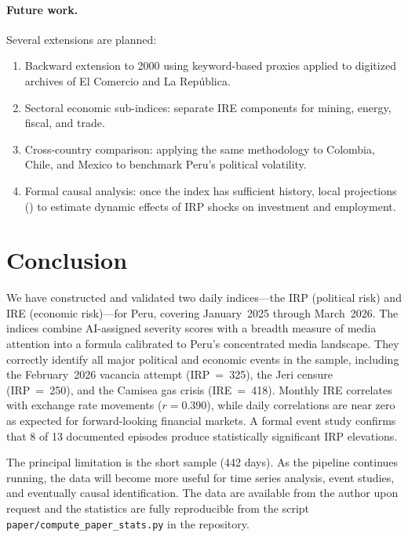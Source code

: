 \documentclass[12pt,a4paper]{article}
\begin{document}
\paragraph{Future work.}
Several extensions are planned:
\begin{enumerate}
  \item Backward extension to 2000 using keyword-based proxies applied to
    digitized archives of El Comercio and La Rep\'ublica.
  \item Sectoral economic sub-indices: separate IRE components for
    mining, energy, fiscal, and trade.
  \item Cross-country comparison: applying the same methodology to
    Colombia, Chile, and Mexico to benchmark Peru's political volatility.
  \item Formal causal analysis: once the index has sufficient history, local
    projections (\citealt{jorda2005}) to estimate dynamic effects of IRP
    shocks on investment and employment.
\end{enumerate}

\section{Conclusion}
\label{sec:conclusion}

We have constructed and validated two daily indices---the IRP (political
risk) and IRE (economic risk)---for Peru, covering January~2025 through
March~2026.  The indices combine AI-assigned severity scores with a
breadth measure of media attention into a formula calibrated to Peru's
concentrated media landscape.  They correctly identify all major political
and economic events in the sample, including the February~2026 vacancia
attempt (IRP~=~325), the Jeri censure (IRP~=~250), and the Camisea gas crisis
(IRE~=~418).  Monthly IRE correlates with exchange rate movements
($r = 0.390$), while daily correlations are near zero as expected for
forward-looking financial markets.  A formal event study confirms that 8 of 13
documented episodes produce statistically significant IRP elevations.

The principal limitation is the short sample (442 days).  As the pipeline
continues running, the data will become more useful for time series
analysis, event studies, and eventually causal identification.  The data
are available from the author upon request and the statistics
are fully reproducible from the script \texttt{paper/compute\_paper\_stats.py}
in the repository.
\end{document}
